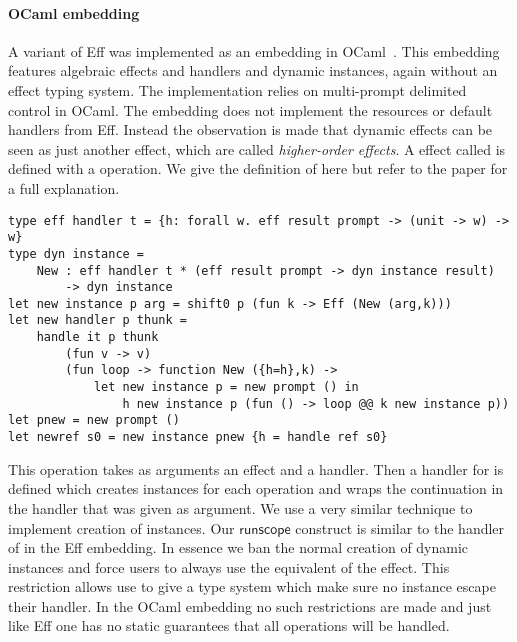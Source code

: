 \paragraph{OCaml embedding}
A variant of Eff was implemented as an embedding in OCaml~\autocite{effdirectly}.
This embedding features algebraic effects and handlers and dynamic instances, again without an effect typing system.
The implementation relies on multi-prompt delimited control in OCaml.
The embedding does not implement the resources or default handlers from Eff.
Instead the observation is made that dynamic effects can be seen as just another effect, which are called \emph{higher-order effects}.
A effect called  is defined with a  operation.
We give the definition of  here but refer to the paper for a full explanation.

\begin{verbatim}
type eff handler t = {h: forall w. eff result prompt -> (unit -> w) -> w}
type dyn instance =
	New : eff handler t * (eff result prompt -> dyn instance result)
		-> dyn instance
let new instance p arg = shift0 p (fun k -> Eff (New (arg,k)))
let new handler p thunk =
	handle it p thunk
		(fun v -> v)
		(fun loop -> function New ({h=h},k) ->
			let new instance p = new prompt () in
				h new instance p (fun () -> loop @@ k new instance p))
let pnew = new prompt ()
let newref s0 = new instance pnew {h = handle ref s0}
\end{verbatim}

This  operation takes as arguments an effect and a handler.
Then a handler for  is defined which creates instances for each  operation and wraps the continuation in the handler that was given as argument.
We use a very similar technique to implement creation of instances.
Our $\mathsf{runscope}$ construct is similar to the handler of  in the Eff embedding.
In essence we ban the normal creation of dynamic instances and force users to always use the equivalent of the  effect.
This restriction allows use to give a type system which make sure no instance escape their handler.
In the OCaml embedding no such restrictions are made and just like Eff one has no static guarantees that all operations will be handled.
\\\\
